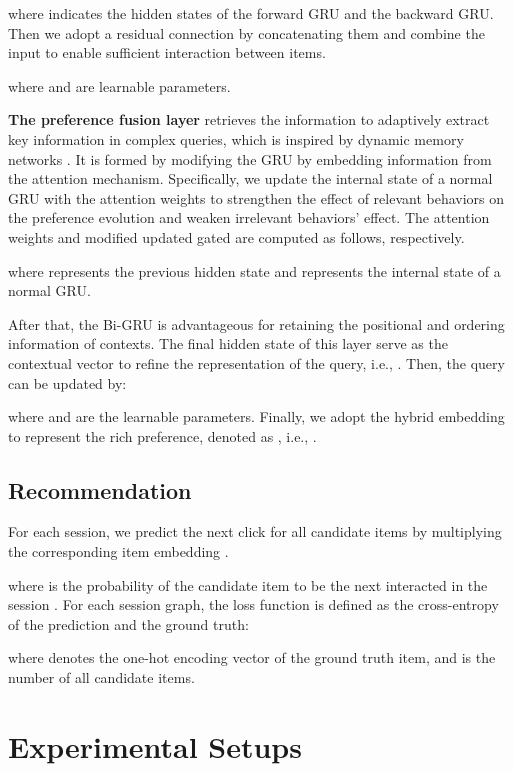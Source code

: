 \documentclass[runningheads]{llncs}
\begin{document}
where  indicates the hidden states of the forward GRU and the backward GRU. 
Then we adopt a residual connection by concatenating them and combine the input to enable sufficient interaction between items.

where   and  are learnable parameters.



{\bf The preference fusion layer} retrieves the information to adaptively extract key information in complex queries, which is inspired by dynamic memory networks \cite{DBLP:conf/icml/XiongMS16}. 
It is formed by modifying the GRU by embedding information from the attention mechanism.
Specifically, we update the internal state of a normal GRU with the attention weights to strengthen the effect of relevant behaviors on the preference evolution and weaken irrelevant behaviors' effect. The attention weights and modified updated gated are computed as follows, respectively.


where  represents the previous hidden state and  represents the internal state of a normal GRU. 

After that, the Bi-GRU is advantageous for retaining the positional and ordering information of contexts.
The final hidden state of this layer serve as the contextual vector to refine the representation of the query, i.e., .
Then, the query can be updated by: 

where  and  are the learnable parameters. 
Finally, we adopt the hybrid embedding to represent the rich preference, denoted as  , i.e., .



\subsection{Recommendation}
For each session, we predict the next click for all candidate items by multiplying the corresponding item embedding .  
 
where  is the probability of the candidate item  to be the next interacted in the session . 
For each session graph, the loss function  is defined as the cross-entropy of the prediction and the ground truth:

where  denotes the one-hot encoding vector of the ground truth item, and  is the number of all candidate items.


\section{Experimental Setups} \label{sec:experiment}
\end{document}
